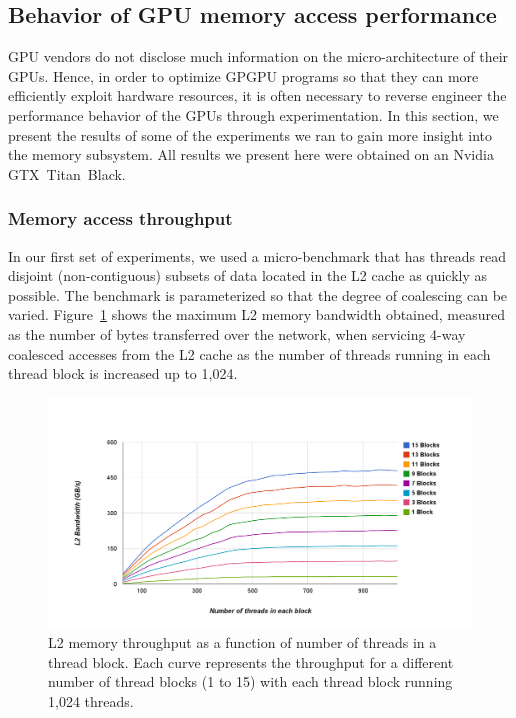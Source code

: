 \subsection{Behavior of GPU memory access performance}  \label{GPUBehavior}

GPU vendors do not disclose much information on the micro-architecture of their GPUs.
Hence, in order to optimize GPGPU programs so that they can more efficiently exploit hardware
resources, it is often necessary to reverse engineer the performance behavior of the GPUs through
experimentation.
In this section, we present the results of some of the experiments we ran to gain more insight into the memory subsystem.
All results we present here were obtained on an Nvidia GTX~Titan~Black.


\subsubsection{Memory access throughput}
In our first set of experiments, we used a micro-benchmark that has threads read disjoint (non-contiguous) subsets of data
located in the L2 cache as quickly as possible.
The benchmark is parameterized so that the degree of coalescing can be varied.
Figure~\ref{fig:MemBandwidth} shows the maximum L2 memory bandwidth obtained, measured as
the number of bytes transferred over the network, when servicing 4-way coalesced
accesses from the L2 cache as the number of threads running in each thread block is increased up to
1,024.



\begin{figure}
\center
\includegraphics[scale=0.21]{AllInL2MultipleSM4WayColaesced.png}
\caption{\footnotesize\textnormal{L2 memory throughput as a function of number of threads in a thread block. Each curve represents the throughput for a different number of thread blocks (1 to 15) with each thread block running 1,024 threads.}}
\label{fig:MemBandwidth}
\end{figure}

